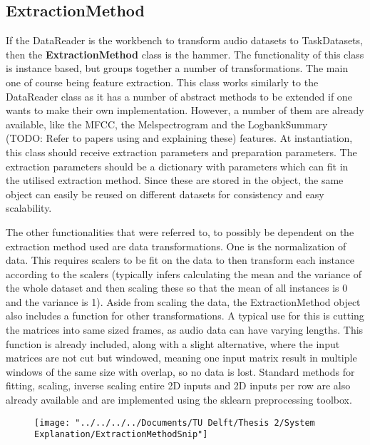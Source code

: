 \subsection{ExtractionMethod} \label{Impl:DataRead:ExtractionMethod}


If the DataReader is the workbench to transform audio datasets to TaskDatasets, then the \textbf{ExtractionMethod} class is the hammer. The functionality of this class is instance based, but groups together a number of transformations. The main one of course being feature extraction. This class works similarly to the DataReader class as it has a number of abstract methods to be extended if one wants to make their own implementation. However, a number of them are already available, like the MFCC, the Melspectrogram and the LogbankSummary (TODO: Refer to papers using and explaining these) features. At instantiation, this class should receive extraction parameters and preparation parameters. The extraction parameters should be a dictionary with parameters which can fit in the utilised extraction method. Since these are stored in the object, the same object can easily be reused on different datasets for consistency and easy scalability. 

The other functionalities that were referred to, to possibly be dependent on the extraction method used are data transformations. One is the normalization of data. This requires scalers to be fit on the data to then transform each instance according to the scalers (typically infers calculating the mean and the variance of the whole dataset and then scaling these so that the mean of all instances is 0 and the variance is 1). Aside from scaling the data, the ExtractionMethod object also includes a function for other transformations. A typical use for this is cutting the matrices into same sized frames, as audio data can have varying lengths. This function is already included, along with a slight alternative, where the input matrices are not cut but windowed, meaning one input matrix result in multiple windows of the same size with overlap, so no data is lost. Standard methods for fitting, scaling, inverse scaling entire 2D inputs and 2D inputs per row are also already available and are implemented using the sklearn preprocessing toolbox.


\begin{figure}
	\centering
	\texttt{[image: "../../../../Documents/TU Delft/Thesis 2/System Explanation/ExtractionMethodSnip"]}
	\caption{}
	\label{fig:extractionmethodsnip}
\end{figure}


